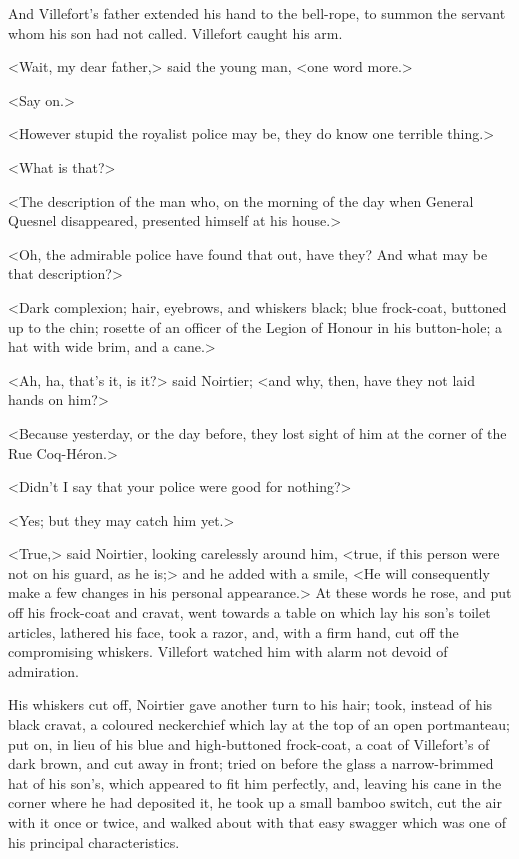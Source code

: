  And Villefort's father extended his hand to the bell-rope, to summon the servant whom his son had not called. Villefort caught his arm. 

 <Wait, my dear father,> said the young man, <one word more.> 

 <Say on.> 

 <However stupid the royalist police may be, they do know one terrible thing.> 

 <What is that?> 

 <The description of the man who, on the morning of the day when General Quesnel disappeared, presented himself at his house.> 

 <Oh, the admirable police have found that out, have they? And what may be that description?> 

 <Dark complexion; hair, eyebrows, and whiskers black; blue frock-coat, buttoned up to the chin; rosette of an officer of the Legion of Honour in his button-hole; a hat with wide brim, and a cane.> 

 <Ah, ha, that's it, is it?> said Noirtier; <and why, then, have they not laid hands on him?>  
 
 
 <Because yesterday, or the day before, they lost sight of him at the corner of the Rue Coq-Héron.> 

 <Didn't I say that your police were good for nothing?> 

 <Yes; but they may catch him yet.> 

 <True,> said Noirtier, looking carelessly around him, <true, if this person were not on his guard, as he is;> and he added with a smile, <He will consequently make a few changes in his personal appearance.> At these words he rose, and put off his frock-coat and cravat, went towards a table on which lay his son's toilet articles, lathered his face, took a razor, and, with a firm hand, cut off the compromising whiskers. Villefort watched him with alarm not devoid of admiration. 

 His whiskers cut off, Noirtier gave another turn to his hair; took, instead of his black cravat, a coloured neckerchief which lay at the top of an open portmanteau; put on, in lieu of his blue and high-buttoned frock-coat, a coat of Villefort's of dark brown, and cut away in front; tried on before the glass a narrow-brimmed hat of his son's, which appeared to fit him perfectly, and, leaving his cane in the corner where he had deposited it, he took up a small bamboo switch, cut the air with it once or twice, and walked about with that easy swagger which was one of his principal characteristics. 

